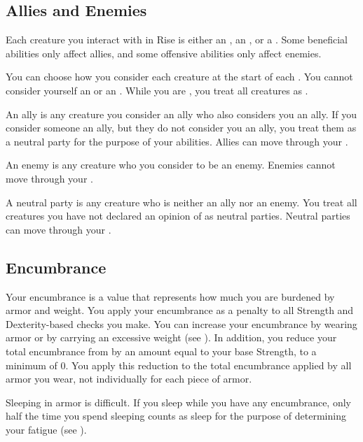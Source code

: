     \subsection{Allies and Enemies}\label{Allies and Enemies}
        Each creature you interact with in Rise is either an , an , or a .
        Some beneficial abilities only affect allies, and some offensive abilities only affect enemies.

        You can choose how you consider each creature at the start of each .
        You cannot consider yourself an  or an .
        While you are , you treat all creatures as .

         An ally is any creature you consider an ally who also considers you an ally.
        If you consider someone an ally, but they do not consider you an ally, you treat them as a neutral party for the purpose of your abilities.
        Allies can move through your .

         An enemy is any creature who you consider to be an enemy.
        Enemies cannot move through your .

         A neutral party is any creature who is neither an ally nor an enemy.
        You treat all creatures you have not declared an opinion of as neutral parties.
        Neutral parties can move through your .

    \subsection{Encumbrance}\label{Encumbrance}
        Your encumbrance is a value that represents how much you are burdened by armor and weight.
        You apply your encumbrance as a penalty to all Strength and Dexterity-based checks you make.
        You can increase your encumbrance by wearing armor or by carrying an excessive weight (see ).
        In addition, you reduce your total encumbrance from  by an amount equal to your base Strength, to a minimum of 0.
        You apply this reduction to the total encumbrance applied by all armor you wear, not individually for each piece of armor.

        Sleeping in armor is difficult.
        If you sleep while you have any encumbrance, only half the time you spend sleeping counts as sleep for the purpose of determining your fatigue (see ).

